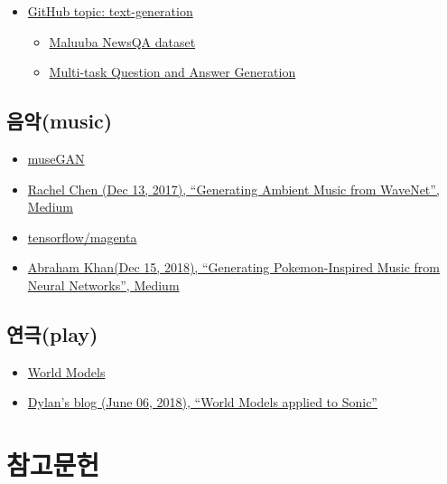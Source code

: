 \documentclass[smallextended]{svjour3}       %
\providecommand{\tightlist}{%
  \setlength{\itemsep}{0pt}\setlength{\parskip}{0pt}}
\begin{document}
\begin{itemize}
\tightlist
\item
  \href{https://github.com/topics/text-generation}{GitHub topic:
  text-generation}

  \begin{itemize}
  \tightlist
  \item
    \href{https://github.com/Maluuba/newsqa}{Maluuba NewsQA dataset}
  \item
    \href{https://github.com/Maluuba/qgen-workshop}{Multi-task Question
    and Answer Generation}
  \end{itemize}
\end{itemize}

\hypertarget{music-machine}{%
\subsection{음악(music)}\label{music-machine}}

\begin{itemize}
\tightlist
\item
  \href{https://salu133445.github.io/musegan/}{museGAN}
\item
  \href{https://medium.com/@rachelchen_49210/generating-ambient-noise-from-wavenet-95aa7f0a8f77}{Rachel
  Chen (Dec 13, 2017), ``Generating Ambient Music from WaveNet'',
  Medium}
\item
  \href{https://github.com/tensorflow/magenta}{tensorflow/magenta}
\item
  \href{https://towardsdatascience.com/generating-pokemon-inspired-music-from-neural-networks-bc240014132}{Abraham
  Khan(Dec 15, 2018), ``Generating Pokemon-Inspired Music from Neural
  Networks'', Medium}
\end{itemize}

\hypertarget{play-machine}{%
\subsection{연극(play)}\label{play-machine}}

\begin{itemize}
\tightlist
\item
  \href{https://worldmodels.github.io/}{World Models}
\item
  \href{https://dylandjian.github.io/world-models/}{Dylan's blog (June
  06, 2018), ``World Models applied to Sonic''}
\end{itemize}

\hypertarget{uxcc38uxace0uxbb38uxd5cc}{%
\section{참고문헌}\label{uxcc38uxace0uxbb38uxd5cc}}

\cite{brynjolfsson2014second} \cite{ford2015rise}
\cite{kaplan2015humans} \cite{cummings2014man} \cite{brownlee_2019}
\cite{chang_2017} \cite{ahlstrom_2019} \cite{wikipedia_2019}
\cite{hui_2018} \cite{zdnet_2019}



\end{document}
